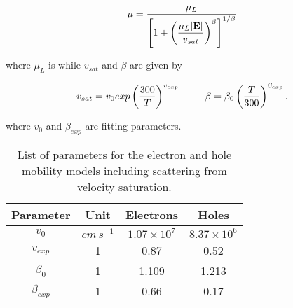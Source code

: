 \begin{equation}
\label{eq: mobility canali}
\mu = \dfrac{\mu_{L}}{\left[ 1 + \left( \dfrac{\mu_{L}|\mathbf{E}|}{v_{sat}} \right)^{\beta}   \right]^{1/\beta}} 
\end{equation}

where $\mu_L$ is  while $v_{sat}$ and $\beta$ are given by

\begin{equation}
\label{eq: mobility canali beta}
v_{sat} = v_0exp\left( 	\dfrac{300}{T} \right)^{v_{exp}} 
\psp{15}
\beta= \beta_0 \left( \dfrac{T}{300} \right)^{\beta_{exp}}.
\end{equation}

where $v_0$ and $\beta_{exp}$ are fitting parameters.

\begin{table}[!h]
\centering
\begin{tabular}{cccc}
\toprule
Parameter & Unit & Electrons & Holes \\
\midrule
$v_0$ & $cm\,s^{-1}$ & $1.07\times 10^{7}$ & $8.37\times 10^{6}$\\
$v_{exp}$ & 1 & 0.87 & 0.52\\
$\beta_0$ & 1 & 1.109 & 1.213 \\
$\beta_{exp}$ & 1 & 0.66 & 0.17\\
\bottomrule
\end{tabular}
\caption{List of parameters for the electron and hole mobility models including scattering from velocity saturation.}
\end{table}

